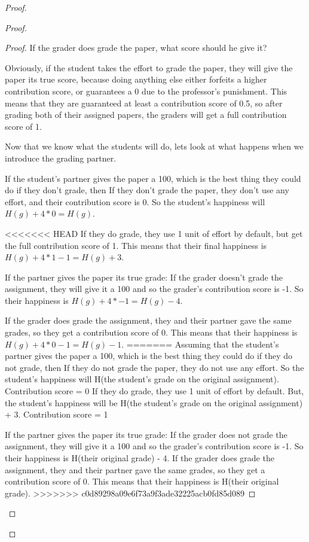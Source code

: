 \documentclass[12pt, Arial]{article}
\begin{document}
\begin{proof}
\begin{proof}
\begin{proof}
If the grader does grade the paper, what score should he give it?

Obviously, if the student takes the effort to grade the paper, they will give the paper its true score, because doing anything else either forfeits a higher contribution score, or guarantees a 0 due to the professor's punishment. This means that they are guaranteed at least a contribution score of 0.5, so after grading both of their assigned papers, the graders will get a full contribution score of 1.

Now that we know what the students will do, lets look at what happens when we introduce the grading partner. 

If the student's partner gives the paper a 100, which is the best thing they could do if they don't grade, then
	If they don't grade the paper, they don't use any effort, and their contribution score is 0. So the student's happiness will $H(g) + 4*0 = H(g)$.

<<<<<<< HEAD
If they do grade, they use 1 unit of effort by default, but get the full contribution score of 1. This means that their final happiness is $H(g) + 4*1 - 1 = H(g)+3$.
	
If the partner gives the paper its true grade:
	If the grader doesn't grade the assignment, they will give it a 100 and so the grader's contribution score is -1. So their happiness is $H(g) + 4*-1 = H(g)-4$.

If the grader does grade the assignment, they and their partner gave the same grades, so they get a contribution score of 0. This means that their happiness is $H(g) + 4*0 - 1 = H(g)-1$.
=======
Assuming that the student's partner gives the paper a 100, which is the best thing they could do if they do not grade, then
	If they do not grade the paper, they do not use any effort. So the student's happiness will H(the student's grade on the original assignment). Contribution score = 0
	If they do grade, they use 1 unit of effort by default. But, the student's happiness will be H(the student's grade on the original assignment) + 3. Contribution score = 1
	
If the partner gives the paper its true grade:
	If the grader does not grade the assignment, they will give it a 100 and so the grader's contribution score is -1. So their happiness is H(their original grade) - 4.
	If the grader does grade the assignment, they and their partner gave the same grades, so they get a contribution score of 0. This means that their happiness is H(their original grade). 
>>>>>>> c0d89298a09e6f73a9f3ade32225acb0fd85d089
	

\end{proof}
\end{proof}
\end{proof}
\end{document}
